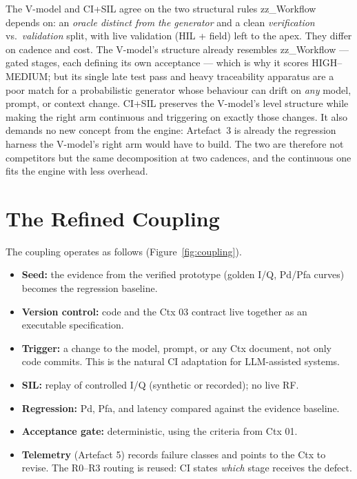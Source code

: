 \documentclass[11pt,a4paper]{article}
\begin{document}
The V-model and CI+SIL agree on the two structural rules zz\_Workflow depends on: an
\emph{oracle distinct from the generator} and a clean \emph{verification} vs.\
\emph{validation} split, with live validation (HIL + field) left to the apex. They
differ on cadence and cost. The V-model's structure already resembles zz\_Workflow ---
gated stages, each defining its own acceptance --- which is why it scores HIGH--MEDIUM;
but its single late test pass and heavy traceability apparatus are a poor match for a
probabilistic generator whose behaviour can drift on \emph{any} model, prompt, or context
change. CI+SIL preserves the V-model's level structure while making the right arm
continuous and triggering on exactly those changes. It also demands no new concept from
the engine: Artefact~3 is already the regression harness the V-model's right arm would
have to build. The two are therefore not competitors but the same decomposition at two
cadences, and the continuous one fits the engine with less overhead.

\section{The Refined Coupling}

The coupling operates as follows (Figure~\ref{fig:coupling}).

\begin{itemize}[leftmargin=*,itemsep=1pt]
\item \textbf{Seed:} the evidence from the verified prototype (golden I/Q, Pd/Pfa curves)
  becomes the regression baseline.
\item \textbf{Version control:} code and the Ctx 03 contract live together as an
  executable specification.
\item \textbf{Trigger:} a change to the model, prompt, or any Ctx document, not only
  code commits. This is the natural CI adaptation for LLM-assisted systems.
\item \textbf{SIL:} replay of controlled I/Q (synthetic or recorded); no live RF.
\item \textbf{Regression:} Pd, Pfa, and latency compared against the evidence baseline.
\item \textbf{Acceptance gate:} deterministic, using the criteria from Ctx 01.
\item \textbf{Telemetry} (Artefact 5) records failure classes and points to the Ctx to
  revise. The R0--R3 routing is reused: CI states \emph{which} stage receives the defect.
\end{itemize}
\end{document}
